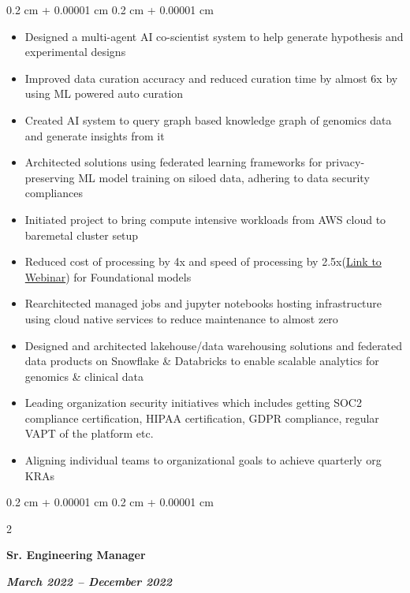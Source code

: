\documentclass[10pt, letterpaper]{article}
\newenvironment{highlights}{
    \begin{itemize}[
        topsep=0.10 cm,
        parsep=0.10 cm,
        partopsep=0pt,
        itemsep=0pt,
        leftmargin=0.4 cm + 10pt
    ]
}{
    \end{itemize}
} %
\newenvironment{onecolentry}{
    \begin{adjustwidth}{
        0.2 cm + 0.00001 cm
    }{
        0.2 cm + 0.00001 cm
    }
}{
    \end{adjustwidth}
} %
\newenvironment{twocolentry}[2][]{
    \onecolentry
    \def\secondColumn{#2}
    \setcolumnwidth{\fill, 6.0 cm}
    \begin{paracol}{2}
}{
    \switchcolumn \raggedleft \secondColumn
    \end{paracol}
    \endonecolentry
} %
\let\hrefWithoutArrow\href
\renewcommand{\href}[2]{\hrefWithoutArrow{#1}{\ifthenelse{\equal{#2}{}}{ }{#2 }\raisebox{.15ex}{\footnotesize \faExternalLink*}}}
\begin{document}
\begin{onecolentry}
                \begin{highlights}
                    \item Designed a multi-agent AI co-scientist system to help generate hypothesis and experimental designs
                    \item Improved data curation accuracy and reduced curation time by almost 6x by using ML powered auto curation
                    \item Created AI system to query graph based knowledge graph of genomics data and generate insights from it
                    \item Architected solutions using federated learning frameworks for privacy-preserving ML model training on siloed data, adhering to data security compliances
                    \item Initiated project to bring compute intensive workloads from AWS cloud to baremetal cluster setup
                    \item Reduced cost of processing by 4x and speed of processing by 2.5x(\hrefWithoutArrow{https://www.elucidata.io/webinars/scaling-compute-for-building-foundation-models-in-biology}{\color{black}Link to Webinar}) for Foundational models
                    \item Rearchitected managed jobs and jupyter notebooks hosting infrastructure using cloud native services to reduce maintenance to almost zero
                    \item Designed and architected lakehouse/data warehousing solutions and federated data products on Snowflake \& Databricks to enable scalable analytics for genomics \& clinical data
                    \item Leading organization security initiatives which includes getting SOC2 compliance certification, HIPAA certification, GDPR compliance, regular VAPT of the platform etc.
                    \item Aligning individual teams to organizational goals to achieve quarterly org KRAs
                \end{highlights}
            \end{onecolentry}


            \vspace{0.3 cm}

            \begin{twocolentry}{
                \textit{\textbf{March 2022 – December 2022}}}
                \textbf{Sr. Engineering Manager}
            \end{twocolentry}
\end{document}
